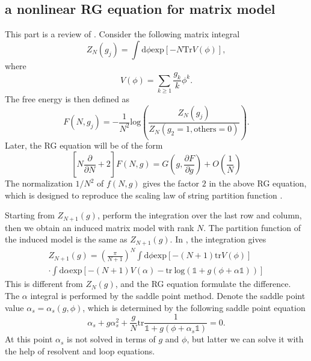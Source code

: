 \subsection{a nonlinear RG equation for matrix model}
This part is a review of \cite{higuchi_renormalization_1995}. Consider the following matrix integral
\begin{equation}
    Z_N(g_j) = \int \mathrm{d}\phi \mathrm{exp}[-N\mathrm{Tr} V(\phi)],
\end{equation}
where
\[V(\phi) = \sum_{k\geq 1}\frac{g_k}{k}\phi^k.\]
The free energy is then defined as
\begin{equation}
    F(N,g_j) = -\frac{1}{N^2} \mathrm{log} \left(\frac{Z_N(g_j)}{Z_N(g_2=1,\text{others}=0)}\right).
\end{equation}
Later, the RG equation will be of the form
\begin{equation}
    \left[N\frac{\partial}{\partial N} + 2\right]F(N,g) = G\left(g,\frac{\partial F}{\partial g}\right) + O(\frac{1}{N})
\end{equation}
The normalization $1/N^2$ of $f(N,g)$ gives the factor $2$ in the above RG equation, which is designed to reproduce the scaling law of string partition function \cite{brezin_renormalization_1992}.

Starting from $Z_{N+1}(g)$, perform the integration over the last row and column, then we obtain an induced matrix model with rank $N$. The partition function of the induced model is the same as $Z_{N+1}(g)$. In \cite{higuchi_renormalization_1995}, the integration gives
\begin{align*}
    Z_{N+1}(g) = \left(\frac{\pi}{N+1}\right)^N \int \mathrm{d}\phi \mathrm{exp}[-(N+1)\mathrm{tr}V(\phi)] \\
    \cdot \int\mathrm{d}\alpha \mathrm{exp}[-(N+1)V(\alpha) - \mathrm{tr}~\mathrm{log}(\mathds{1}+g(\phi+\alpha\mathds{1}))]
\end{align*}
This is different from $Z_N(g)$, and the RG equation formulate the difference. The $\alpha$ integral is performed by the saddle point method. Denote the saddle point value $\alpha_s = \alpha_s(g,\phi)$, which is determined by the following saddle point equation
\begin{equation}
    \alpha_s + g \alpha_s^2 + \frac{g}{N}\mathrm{tr}\frac{1}{\mathds{1}+g(\phi+\alpha_s\mathds{1})} = 0.
\end{equation}
At this point $\alpha_s$ is not solved in terms of $g$ and $\phi$, but latter we can solve it with the help of resolvent and loop equations. 

